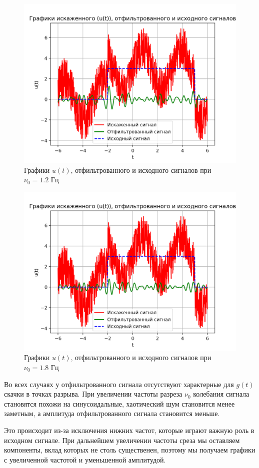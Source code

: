 \begin{figure}[ht!]
    \centering
    \includegraphics[scale=0.75]{media/1 task/low_freq/Cleaned_4_2_2_-1,1981981981981982.png}
    \caption{Графики  $u(t)$, отфильтрованного и исходного сигналов при $\nu_0=1.2$ Гц}
    \label{fig:cleaned_4_2_2_1.2}
\end{figure}

\clearpage

\begin{figure}[ht!]
    \centering
    \includegraphics[scale=0.75]{media/1 task/low_freq/Cleaned_4_2_2_-1,7987987987987988.png}
    \caption{Графики  $u(t)$, отфильтрованного и исходного сигналов при $\nu_0=1.8$ Гц}
    \label{fig:cleaned_4_2_2_1.8}
\end{figure}

Во всех случаях у отфильтрованного сигнала отсутствуют характерные для $g(t)$ скачки в точках разрыва. При увеличении частоты разреза $\nu_0$ колебания сигнала становятся похожи на синусоидальные, хаотический шум становится менее заметным, а амплитуда отфильтрованного сигнала становится меньше. 

Это происходит из-за исключения нижних частот, которые играют важную роль в исходном сигнале. При дальнейшем увеличении частоты среза мы оставляем компоненты, вклад которых не столь существенен, поэтому мы получаем графики с увеличенной частотой и уменьшенной амплитудой. 